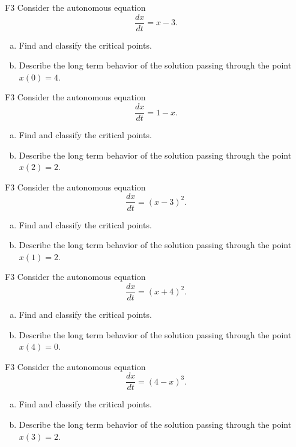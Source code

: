 \begin{problem}{F3}
Consider the autonomous equation
\[
\frac{dx}{dt} = x - 3.
\]
\begin{enumerate}[(a)]
\item Find and classify the critical points.
\item Describe the long term behavior of the solution passing through the point \(x(0)=4\).
\end{enumerate}
\end{problem}

\begin{problem}{F3}
Consider the autonomous equation
\[
\frac{dx}{dt} = 1 - x.
\]
\begin{enumerate}[(a)]
\item Find and classify the critical points.
\item Describe the long term behavior of the solution passing through the point \(x(2)=2\).
\end{enumerate}
\end{problem}

\begin{problem}{F3}
Consider the autonomous equation
\[
\frac{dx}{dt} = (x - 3)^2.
\]\begin{enumerate}[(a)]
\item Find and classify the critical points.
\item Describe the long term behavior of the solution passing through the point \(x(1)=2\).
\end{enumerate}
\end{problem}

\begin{problem}{F3}
Consider the autonomous equation
\[
\frac{dx}{dt} = (x + 4)^2.
\]\begin{enumerate}[(a)]
\item Find and classify the critical points.
\item Describe the long term behavior of the solution passing through the point \(x(4)=0\).
\end{enumerate}
\end{problem}

\begin{problem}{F3}
Consider the autonomous equation
\[
\frac{dx}{dt} = (4 - x)^3.
\]\begin{enumerate}[(a)]
\item Find and classify the critical points.
\item Describe the long term behavior of the solution passing through the point \(x(3)=2\).
\end{enumerate}
\end{problem}

